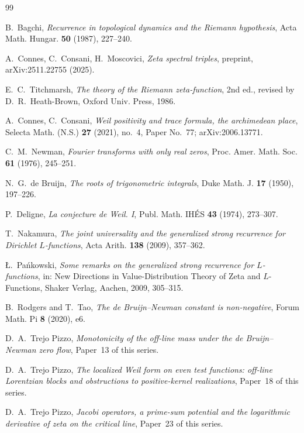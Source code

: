 \documentclass[11pt]{amsart}
\theoremstyle{definition}
\theoremstyle{remark}
\begin{document}
\begin{thebibliography}{99}

 B.~Bagchi, \emph{Recurrence in topological dynamics and the Riemann
hypothesis}, Acta Math. Hungar. \textbf{50} (1987), 227--240.

 A.~Connes, C.~Consani, H.~Moscovici, \emph{Zeta spectral triples}, preprint, arXiv:2511.22755 (2025).

 E.~C.~Titchmarsh, \emph{The theory of the Riemann zeta-function}, 2nd ed., revised
by D.~R.~Heath-Brown, Oxford Univ. Press, 1986.

 A.~Connes, C.~Consani,
\emph{Weil positivity and trace formula, the archimedean place},
Selecta Math. (N.S.) \textbf{27} (2021), no.~4, Paper No.~77; arXiv:2006.13771.

 C.~M.~Newman, \emph{Fourier transforms with only real zeros}, Proc. Amer. Math. Soc.
\textbf{61} (1976), 245--251.

 N.~G.~de Bruijn, \emph{The roots of trigonometric integrals}, Duke Math. J.
\textbf{17} (1950), 197--226.

 P.~Deligne, \emph{La conjecture de Weil. I},
Publ. Math. IH\'ES \textbf{43} (1974), 273--307.

 T.~Nakamura, \emph{The joint universality and the generalized strong recurrence
for Dirichlet $L$-functions}, Acta Arith. \textbf{138} (2009), 357--362.

 \L.~Pa\'nkowski, \emph{Some remarks on the generalized strong recurrence for
$L$-functions}, in: New Directions in Value-Distribution Theory of Zeta and $L$-Functions,
Shaker Verlag, Aachen, 2009, 305--315.

 B.~Rodgers and T.~Tao, \emph{The de Bruijn--Newman constant is non-negative},
Forum Math. Pi \textbf{8} (2020), e6.

 D.~A.~Trejo Pizzo, \emph{Monotonicity of the off-line mass under the de
Bruijn--Newman zero flow}, Paper~13 of this series.

 D.~A.~Trejo Pizzo, \emph{The localized Weil form on even test functions: off-line
Lorentzian blocks and obstructions to positive-kernel realizations}, Paper~18 of this series.

 D.~A.~Trejo Pizzo, \emph{Jacobi operators, a prime-sum potential and the logarithmic derivative of zeta on the critical line}, Paper~23 of this series.


\end{thebibliography}
\end{document}
